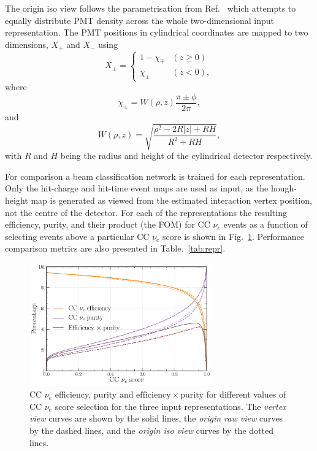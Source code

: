 The origin iso view follows the parametrisation from Ref.~\cite{berns2020} which attempts to
equally distribute PMT density across the whole two-dimensional input representation. The PMT
positions in cylindrical coordinates are mapped to two dimensions, $X_{+}$ and $X_{-}$ using
\begin{equation} %
    X_{\pm}=
    \begin{cases}
        1-\chi_{\mp} & (z \geq 0) \\
        \chi_{\pm}   & (z < 0),
    \end{cases}
    \label{eq:iso_case}
\end{equation}
where
\begin{equation} %
    \chi_{\pm}=W(\rho,z)\frac{\pi\pm\phi}{2\pi},
    \label{eq:iso_main}
\end{equation}
and
\begin{equation} %
    W(\rho,z)=\sqrt{\frac{\rho^{2}-2R|z|+RH}{R^{2}+RH}},
    \label{eq:iso_part}
\end{equation}
with $R$ and $H$ being the radius and height of the cylindrical detector respectively.

For comparison a beam classification network is trained for each representation. Only the
hit-charge and hit-time event maps are used as input, as the hough-height map is generated as
viewed from the estimated interaction vertex position, not the centre of the detector. For each of
the representations the resulting efficiency, purity, and their product (the FOM) for CC $\nu_{e}$
events as a function of selecting events above a particular CC $\nu_{e}$ score is shown in
Fig.~\ref{fig:repr_nuel_eff_curves}. Performance comparison metrics are also presented in
Table.~\ref{tab:repr}.

\begin{figure} %
    \includegraphics[width=0.7\textwidth]{diagrams/7-results/repr_nuel_eff_curves.pdf}
    \caption[CC $\nu_{e}$ efficiency and purity curves for three input representations]
    {CC $\nu_{e}$ efficiency, purity and $\mathrm{efficiency}\times\mathrm{purity}$ for different
        values of CC $\nu_{e}$ score selection for the three input representations. The
        \emph{vertex view} curves are shown by the solid lines, the \emph{origin raw view} curves
        by the dashed lines, and the \emph{origin iso view} curves by the dotted lines.}
    \label{fig:repr_nuel_eff_curves}
\end{figure}

